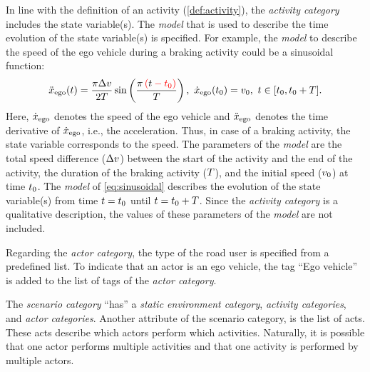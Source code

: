 In line with the definition of an activity (\cref{def:activity}), the \textit{activity category} includes the state \cstart variable(s)\cend.
The \textit{model} that is used to describe the time evolution of the state \cstart variable(s) \cend is specified. For example, the \textit{model} to describe the speed of the ego vehicle during a braking activity could be a sinusoidal function:
\begin{equation} \label{eq:sinusoidal}
	\ddot{x}_{\mathrm{ego}}(t) = \frac{\pi \Delta v}{2T} \sin \left( \frac{\pi \color{red}\left(\color{black} t \color{red} - t_{0}\right)\color{black}}{T} \right),\ \dot{x}_{\mathrm{ego}}(t_{0}) = v_{0},\ t \in [t_{0}, t_{0}+T].
\end{equation}
Here, $\dot{x}_{\mathrm{ego}}$ denotes the speed of the ego vehicle and $\ddot{x}_{\mathrm{ego}}$ denotes the time derivative of $\dot{x}_{\mathrm{ego}}$, i.e., the acceleration. Thus, in case of a braking activity, the state \cstart variable \cend corresponds to the speed. 
The parameters of the \textit{model} are the total speed difference ($\Delta v$) between the start of the activity and the end of the activity, the duration of the braking activity ($T$), and the initial speed ($v_{0}$) at time $t_{0}$. 
The \textit{model} of \cref{eq:sinusoidal} describes the evolution of the state \cstart variable(s) \cend from time $t=t_{0}$ until $t=t_{0}+T$. Since the \textit{activity category} is a qualitative description, the values of these parameters of the \textit{model} are not included.

Regarding the \textit{actor category}, the type of the road user is specified from a predefined list. To indicate that an actor is an ego vehicle, the tag ``Ego vehicle'' is added to the list of tags of the \textit{actor category}.

The \textit{scenario category} ``has'' a \textit{static environment category}, \textit{activity categories}, and \textit{actor categories}. 
Another attribute of the scenario category, is the list of acts. %
These acts describe which actors perform which activities. Naturally, it is possible that one actor performs multiple activities and that one activity is performed by multiple actors.


